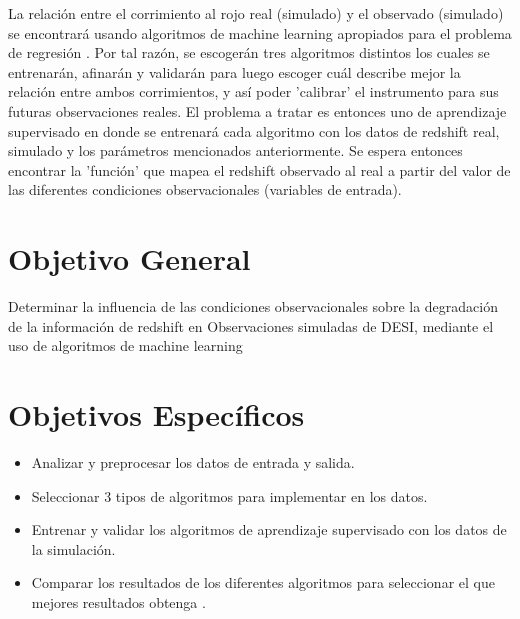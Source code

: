 \documentclass[12pt]{article}
\begin{document}
La relación entre el corrimiento al rojo real (simulado) y el
observado (simulado) se encontrará usando algoritmos de machine
learning apropiados para el problema de regresión
\cite{bishop2006pattern}. Por tal razón, se escogerán tres algoritmos
distintos los cuales se entrenarán, afinarán y validarán para luego
escoger cuál describe mejor la relación entre ambos corrimientos, y
así poder 'calibrar' el instrumento para sus futuras observaciones
reales. El problema a tratar es entonces uno de aprendizaje
supervisado en donde se entrenará cada algoritmo con los datos de
redshift real, simulado y los parámetros mencionados anteriormente. Se
espera entonces encontrar la 'función' que mapea el redshift observado
al real a partir del valor de las diferentes condiciones
observacionales (variables de entrada).  







\section{Objetivo General}


Determinar la influencia de las condiciones observacionales sobre la
degradación de la información de redshift en Observaciones simuladas
de DESI, mediante el uso de algoritmos de machine learning 
 
\section{Objetivos Específicos}


\begin{itemize}
	\item Analizar y preprocesar los datos de entrada y salida.
	\item Seleccionar 3 tipos de algoritmos para implementar en los datos.
	\item Entrenar y validar los algoritmos de aprendizaje
          supervisado con los datos de la simulación.
	\item Comparar los resultados de los diferentes algoritmos
          para seleccionar el que mejores resultados obtenga .
\end{itemize}
\end{document}
